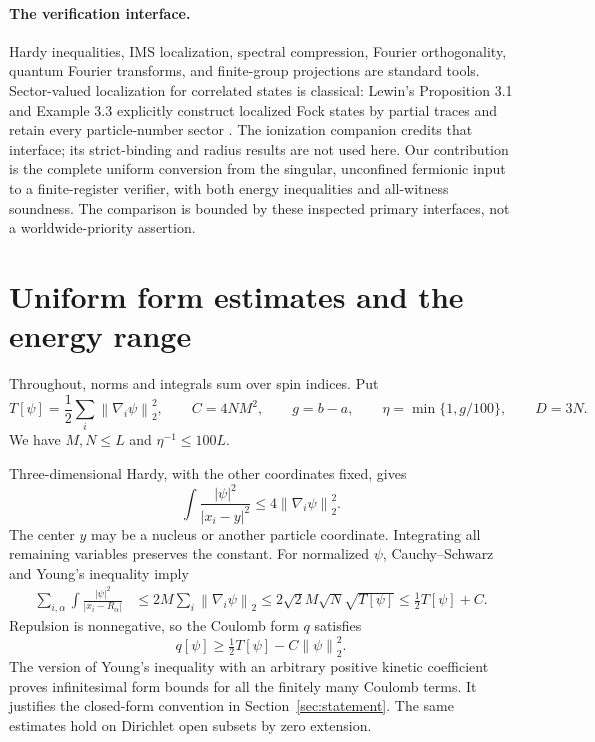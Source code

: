 \documentclass[11pt]{article}
\theoremstyle{remark}\newtheorem{remark}[theorem]{Remark}
\newcommand{\norm}[1]{\left\lVert#1\right\rVert}
\numberwithin{equation}{section}
\begin{document}
\paragraph{The verification interface.}
Hardy inequalities, IMS localization, spectral compression, Fourier
orthogonality, quantum Fourier transforms, and finite-group projections are
standard tools. Sector-valued localization for correlated states is classical:
Lewin's Proposition 3.1 and Example 3.3 explicitly construct localized Fock
states by partial traces and retain every particle-number sector
\cite{lewin}. The ionization companion \cite{ionization} credits that
interface; its strict-binding and radius results are not used here. Our
contribution is the complete uniform conversion from the singular, unconfined
fermionic input to a finite-register verifier, with both energy inequalities
and all-witness soundness. The comparison is bounded by these inspected
primary interfaces, not a worldwide-priority assertion.

\section{Uniform form estimates and the energy range}
\label{sec:forms}
Throughout, norms and integrals sum over spin indices. Put
\begin{equation}\label{eq:base}
 T[\psi]=\frac12\sum_i\norm{\nabla_i\psi}_2^2,
 \qquad C=4NM^2,\qquad g=b-a,\qquad
 \eta=\min\{1,g/100\},\qquad D=3N.
\end{equation}
We have $M,N\leq L$ and $\eta^{-1}\leq100L$.

Three-dimensional Hardy, with the other coordinates fixed, gives
\begin{equation}\label{eq:hardy}
 \int\frac{|\psi|^2}{|x_i-y|^2}\leq4\norm{\nabla_i\psi}_2^2.
\end{equation}
The center $y$ may be a nucleus or another particle coordinate. Integrating
all remaining variables preserves the constant. For normalized $\psi$,
Cauchy--Schwarz and Young's inequality imply
\begin{align}
 \sum_{i,\alpha}\int\frac{|\psi|^2}{|x_i-R_\alpha|}
 &\leq2M\sum_i\norm{\nabla_i\psi}_2
 \leq2\sqrt2 M\sqrt N\sqrt{T[\psi]}
 \leq\tfrac12T[\psi]+C.\label{eq:attraction}
\end{align}
Repulsion is nonnegative, so the Coulomb form $q$ satisfies
\begin{equation}\label{eq:coercive}
 q[\psi]\geq\tfrac12T[\psi]-C\norm\psi_2^2.
\end{equation}
The version of Young's inequality with an arbitrary positive kinetic
coefficient proves infinitesimal form bounds for all the finitely many
Coulomb terms. It justifies the closed-form convention in
Section~\ref{sec:statement}. The same estimates hold on Dirichlet open
subsets by zero extension.
\end{document}
